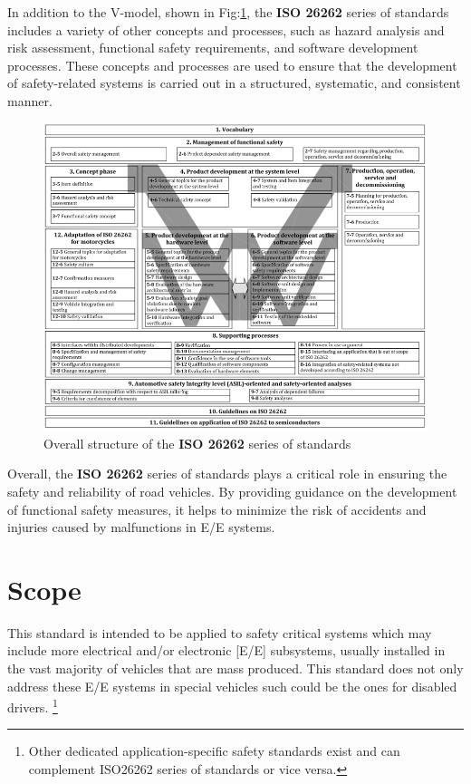 \documentclass[./dissertation.tex]{subfiles}
\begin{document}
In addition to the V-model, shown in Fig:\ref{fig:ISO_26262_structure}, the \textbf{ISO 26262} series of standards includes a variety of other concepts and processes, such as hazard analysis and risk assessment, functional safety requirements, and software development processes. These concepts and processes are used to ensure that the development of safety-related systems is carried out in a structured, systematic, and consistent manner.
\begin{figure}[H]
\centering
\includegraphics[scale=0.6]{subfiles/imgs/ISO_26262_structure.png}
\caption{Overall structure of the \textbf{ISO 26262} series of standards}
\label{fig:ISO_26262_structure}
\end{figure}
\restoregeometry
Overall, the \textbf{ISO 26262} series of standards plays a critical role in ensuring the safety and reliability of road vehicles. By providing guidance on the development of functional safety measures, it helps to minimize the risk of accidents and injuries caused by malfunctions in E/E systems.

\section{Scope}
This standard is intended to be applied to safety critical systems which may include more electrical and/or electronic [E/E] subsystems, usually installed in the vast majority of vehicles that are mass produced. This standard does not only address these E/E systems in special vehicles such could be the ones for disabled drivers. \footnote{ Other dedicated application-specific safety standards exist and can complement ISO26262 series of standards or vice versa.}
\end{document}
